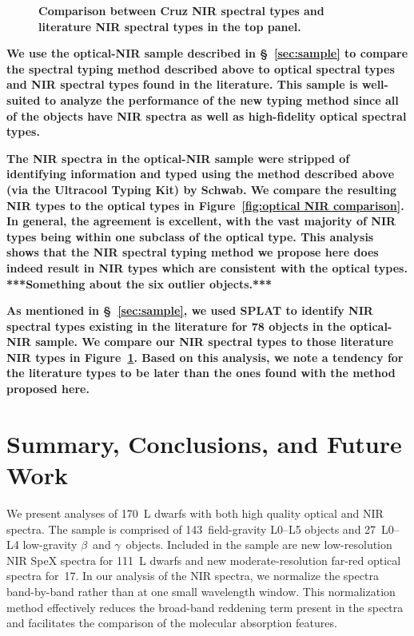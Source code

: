 \documentclass[12pt]{aastex6}
\newcommand{\sample}{170}
\newcommand{\optField}{143}
\newcommand{\optLowG}{27}
\newcommand{\NewOptObjects}{17} %
\newcommand{\NewPrismObjects}{111} %
\begin{document}
\begin{figure}
  \caption{\textbf{Comparison between Cruz NIR spectral types and literature NIR spectral types in the top panel.}}
  \label{fig:Lit NIR comparison}
\end{figure}

\textbf{We use the optical-NIR sample described in \S~\ref{sec:sample} to compare the spectral typing method described above to optical spectral types and NIR spectral types found in the literature.
This sample is well-suited to analyze the performance of the new typing method since all of the objects have NIR spectra as well as high-fidelity optical spectral types.}

\textbf{The NIR spectra in the optical-NIR sample were stripped of identifying information and typed using the method described above (via the Ultracool Typing Kit) by Schwab.
We compare the resulting NIR types to the optical types in Figure~\ref{fig:optical NIR comparison}.
In general, the agreement is excellent, with the vast majority of NIR types being within one subclass of the optical type.
This analysis shows that the NIR spectral typing method we propose here does indeed result in NIR types which are consistent with the optical types.
***Something about the six outlier objects.***}

\textbf{As mentioned in  \S~\ref{sec:sample}, we used SPLAT to identify NIR spectral types existing in the literature for 78 objects in the optical-NIR sample.
We compare our NIR spectral types to those literature NIR types in Figure~\ref{fig:Lit NIR comparison}.
Based on this analysis, we note a tendency for the literature types to be later than the ones found with the method proposed here.}

\section{Summary, Conclusions, and Future Work}
\label{sec:summary}
We present analyses of \sample~L dwarfs with both high quality optical and NIR spectra.
The sample is comprised of \optField~field-gravity L0--L5 objects and \optLowG~L0--L4 low-gravity $\beta$~and $\gamma$~objects.
Included in the sample are new low-resolution NIR SpeX spectra for \NewPrismObjects~L dwarfs and new moderate-resolution far-red optical spectra for~\NewOptObjects.
In our analysis of the NIR spectra, we normalize the spectra band-by-band rather than at one small wavelength window.
This normalization method effectively reduces the broad-band reddening term present in the spectra and facilitates the comparison of the molecular absorption features.
\end{document}
